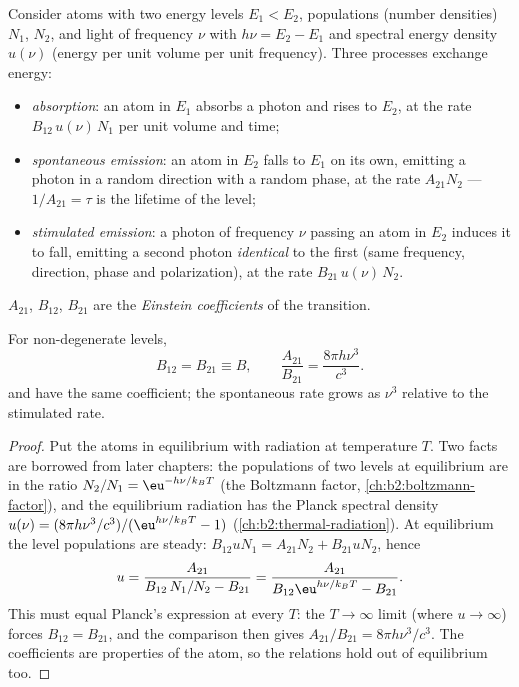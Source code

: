 \begin{definition}\label{def:b2:laser:processes}
Consider atoms with two energy levels $E_1 < E_2$, populations (number
densities) $N_1$, $N_2$, and light of frequency $\nu$ with
$h\nu = E_2 - E_1$ and spectral energy density $u(\nu)$ (energy per unit
volume per unit frequency). Three processes exchange energy:
\begin{itemize}
\item \emph{absorption}: an atom in
      $E_1$ absorbs a photon and rises to $E_2$, at the rate
      $B_{12}\,u(\nu)\,N_1$ per unit volume and time;
\item \emph{spontaneous emission}: an atom
      in $E_2$ falls to $E_1$ on its own, emitting a photon in a random
      direction with a random phase, at the rate $A_{21}N_2$ ---
      $1/A_{21} = \tau$ is the lifetime of the level;
\item \emph{stimulated emission}: a photon
      of frequency $\nu$ passing an atom in $E_2$ induces it to fall,
      emitting a second photon \emph{identical} to the first (same
      frequency, direction, phase and polarization), at the rate
      $B_{21}\,u(\nu)\,N_2$.
\end{itemize}
$A_{21}$, $B_{12}$, $B_{21}$ are the \emph{Einstein
coefficients} of the transition.
\end{definition}

\begin{proposition}\label{prop:b2:laser:einstein}
For non-degenerate levels,
\[
B_{12} = B_{21} \equiv B, \qquad
\frac{A_{21}}{B_{21}} = \frac{8\pi h\nu^3}{c^3}.
\]
 and  have the same coefficient; the
spontaneous rate grows as $\nu^3$ relative to the stimulated rate.
\end{proposition}

\begin{proof}
Put the atoms in equilibrium with radiation at temperature $T$. Two
facts are borrowed from later chapters: the populations of two levels
at equilibrium are in the ratio $N_2/N_1 = \eu^{-h\nu/k_BT}$ (the
Boltzmann factor, \cref{ch:b2:boltzmann-factor}), and the equilibrium
radiation has the Planck spectral density
$u(\nu) = (8\pi h\nu^3/c^3)/(\eu^{h\nu/k_BT} - 1)$
(\cref{ch:b2:thermal-radiation}). At equilibrium the level populations
are steady: $B_{12}uN_1 = A_{21}N_2 + B_{21}uN_2$, hence
\[
u = \frac{A_{21}}{B_{12}\,N_1/N_2 - B_{21}}
  = \frac{A_{21}}{B_{12}\eu^{h\nu/k_BT} - B_{21}}.
\]
This must equal Planck's expression at every $T$: the $T \to \infty$
limit (where $u \to \infty$) forces $B_{12} = B_{21}$, and the
comparison then gives $A_{21}/B_{21} = 8\pi h\nu^3/c^3$. The
coefficients are properties of the atom, so the relations hold out of
equilibrium too.
\end{proof}

